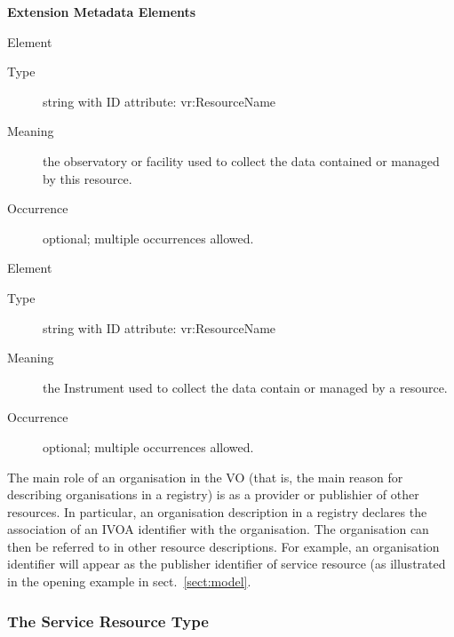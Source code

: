 \documentclass[11pt,a4paper]{ivoa}
\begin{document}
\vspace{0.5ex}\noindent\textbf{ Extension Metadata Elements}

\begingroup\small\begin{bigdescription}\item[Element \xmlel{facility}]
\begin{description}
\item[Type] string with ID attribute: vr:ResourceName
\item[Meaning] 
                       the observatory or facility used to collect the data 
                       contained or managed by this resource.  
                     
\item[Occurrence] optional; multiple occurrences allowed.

\end{description}
\item[Element \xmlel{instrument}]
\begin{description}
\item[Type] string with ID attribute: vr:ResourceName
\item[Meaning] 
                       the Instrument used to collect the data contain or 
                       managed by a resource.  
                     
\item[Occurrence] optional; multiple occurrences allowed.

\end{description}


\end{bigdescription}\endgroup

\endgroup

The main role of an organisation in the VO (that is, the main reason
for describing organisations in a registry) is as a provider or
publishier of other resources.  In particular, an organisation
description in a registry declares the association of an IVOA
identifier with the organisation.  The
organisation can then be referred to in other resource descriptions.
For example, an organisation identifier will appear as the publisher
identifier of service resource (as illustrated in the opening
example in sect.~\ref{sect:model}.


\subsubsection{The Service Resource Type}
\end{document}
